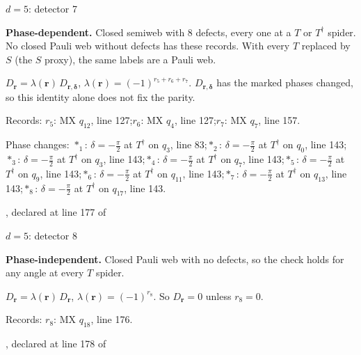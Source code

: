 \label{d5_det007}
{\Large $d=5$: detector 7}\par
\textbf{Phase-dependent.} Closed semiweb with 8 defects, every one at a $T$ or $T^\dagger$ spider. No closed Pauli web without defects has these records. With every $T$ replaced by $S$ (the $S$ proxy), the same labels are a Pauli web.
\begin{center}
\end{center}
\vspace{-1mm}
$D_{\boldsymbol r}=\lambda(\boldsymbol r)\,D_{\boldsymbol r,\boldsymbol\delta}$, \quad $\lambda(\boldsymbol r)=(-1)^{r_{5}+r_{6}+r_{7}}$. \qquad $D_{\boldsymbol r,\boldsymbol\delta}$ has the marked phases changed, so this identity alone does not fix the parity.
\par\smallskip\begin{minipage}{.98\linewidth}\small Records: $r_{5}$: MX $q_{12}$, line 127;\quad $r_{6}$: MX $q_{4}$, line 127;\quad $r_{7}$: MX $q_{7}$, line 157.\end{minipage}
\par\smallskip\begin{minipage}{.98\linewidth}\small Phase changes: $\ast_{1}$: $\delta=-\frac{\pi}{2}$ at $T^\dagger$ on $q_{3}$, line 83;\quad $\ast_{2}$: $\delta=-\frac{\pi}{2}$ at $T^\dagger$ on $q_{0}$, line 143;\quad $\ast_{3}$: $\delta=-\frac{\pi}{2}$ at $T^\dagger$ on $q_{3}$, line 143;\quad $\ast_{4}$: $\delta=-\frac{\pi}{2}$ at $T^\dagger$ on $q_{7}$, line 143;\quad $\ast_{5}$: $\delta=-\frac{\pi}{2}$ at $T^\dagger$ on $q_{9}$, line 143;\quad $\ast_{6}$: $\delta=-\frac{\pi}{2}$ at $T^\dagger$ on $q_{11}$, line 143;\quad $\ast_{7}$: $\delta=-\frac{\pi}{2}$ at $T^\dagger$ on $q_{13}$, line 143;\quad $\ast_{8}$: $\delta=-\frac{\pi}{2}$ at $T^\dagger$ on $q_{17}$, line 143.\end{minipage}
\vfill
{\footnotesize\texttt{}, declared at line 177 of \texttt{}}
\newpage

\label{d5_det008}
{\Large $d=5$: detector 8}\par
\textbf{Phase-independent.} Closed Pauli web with no defects, so the check holds for any angle at every $T$ spider.
\begin{center}
\end{center}
\vspace{-1mm}
$D_{\boldsymbol r}=\lambda(\boldsymbol r)\,D_{\boldsymbol r}$, \quad $\lambda(\boldsymbol r)=(-1)^{r_{8}}$. \qquad So $D_{\boldsymbol r}=0$ unless $r_{8}=0$.
\par\smallskip\begin{minipage}{.98\linewidth}\small Records: $r_{8}$: MX $q_{18}$, line 176.\end{minipage}
\vfill
{\footnotesize\texttt{}, declared at line 178 of \texttt{}}
\newpage

